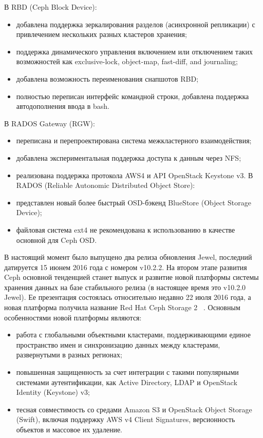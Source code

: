 \documentclass[10pt, a5paper]{article}
\begin{document}
В RBD (Ceph Block Device):

\begin{itemize}
  \item добавлена поддержка зеркалирования разделов (асинхронной репликации) с привлечением нескольких разных кластеров хранения;
  \item поддержка динамического управления включением или отключением таких возможностей как exclusive-lock, object-map, fast-diff, and journaling;
  \item добавлена возможность переименования снапшотов RBD;
  \item полностью переписан интерфейс командной строки, добавлена поддержка автодополнения ввода в bash.
\end{itemize}

В RADOS Gateway (RGW):

\begin{itemize}
  \item переписана и перепроектирована система межкластерного взаимодействия;
  \item добавлена экспериментальная поддержка доступа к данным через NFS;
  \item реализована поддержка протокола AWS4 и API OpenStack Keystone v3.
В RADOS (Reliable Autonomic Distributed Object Store):
  \item представлен новый более быстрый OSD-бэкенд BlueStore \linebreak (Object Storage Device);
  \item файловая система ext4 не рекомендована к использованию в качестве основной для Ceph OSD.
\end{itemize}

В настоящий момент было выпущено два релиза обновления Jewel, последний датируется 15 июнем 2016 года с номером  v10.2.2.
На втором этапе развития Ceph основной тенденцией станет выпуск и развитие новой платформы системы хранения данных на базе стабильного релиза (в настоящее время это v10.2.0 Jewel). Ее презентация состоялась относительно недавно 22 июля 2016 года, а новая платформа получила название Red Hat Ceph Storage 2 ~\cite{Kliga6}. Основным особенностями новой платформы являются:

\begin{itemize}
  \item работа с глобальными объектными кластерами, поддерживающими единое пространство имен и синхронизацию данных между кластерами, развернутыми в разных регионах;
  \item повышенная защищенность за счет интеграции с такими популярными системами аутентификации, как Active Directory, LDAP и OpenStack Identity (Keystone) v3;
  \item тесная совместимость со средами Amazon S3 и OpenStack \linebreak Object Storage (Swift), включая поддержку AWS v4 Client Signatures, версионность объектов и массовое их удаление.
\end{itemize}
\end{document}
